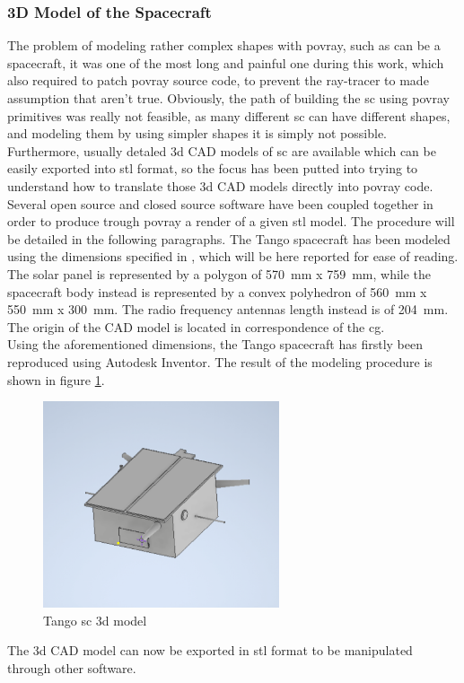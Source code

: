 \subsubsection{3D Model of the Spacecraft}
The problem of modeling rather complex shapes with \acrshort{povray}, such as can be a spacecraft, it was one of the most long and painful one during this work, which also required to patch \acrshort{povray} source code, to prevent the ray-tracer to made assumption that aren't true. Obviously, the path of building the \acrshort{sc} using \acrshort{povray} primitives was really not feasible, as many different \acrshort{sc} can have different shapes, and modeling them by using simpler shapes it is simply not possible. Furthermore, usually detaled \acrshort{3d} CAD models of \acrshort{sc} are available which can be easily exported into \acrshort{stl} format, so the focus has been putted into trying to understand how to translate those \acrshort{3d} CAD models directly into \acrshort{povray} code.
Several open source and closed source software have been coupled together in order to produce trough \acrshort{povray} a render of a given \acrshort{stl} model.
The procedure will be detailed in the following paragraphs.
The Tango spacecraft has been modeled using the dimensions specified in \cite{Sharma2018}, which will be here reported for ease of reading. The solar panel is represented by a polygon of \SI{570}{\mm} x \SI{759}{\mm}, while the spacecraft body instead is represented by a convex polyhedron of \SI{560}{\mm} x \SI{550}{mm} x \SI{300}{\mm}. The radio frequency antennas length instead is of \SI{204}{\mm}. The origin of the CAD model is located in correspondence of the \acrshort{cg}.\\
Using the aforementioned dimensions, the Tango spacecraft has firstly been reproduced using Autodesk Inventor. The result of the modeling procedure is shown in figure \ref{fig:tango3d}.

\begin{figure}[htbp]
  \centering
  \includegraphics[width=0.62\textwidth]{gfx/tangoScreenshot2.eps}
  \caption{Tango \acrshort{sc} \acrshort{3d} model}
  \label{fig:tango3d}
\end{figure}
The \acrshort{3d} CAD model can now be exported in \acrshort{stl} format to be manipulated through other software.

